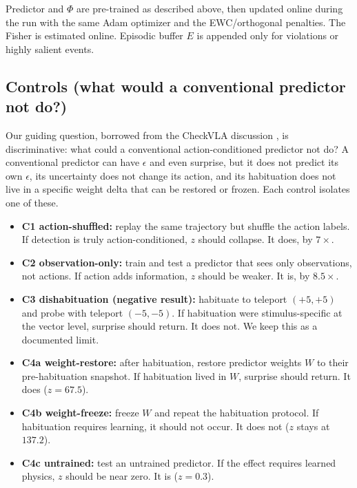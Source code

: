 \documentclass[11pt,a4paper]{article}
\begin{document}
Predictor and $\Phi$ are pre-trained as described above, then updated online during the run with the same Adam optimizer and the EWC/orthogonal penalties. The Fisher is estimated online. Episodic buffer $E$ is appended only for violations or highly salient events.

\subsection{Controls (what would a conventional predictor not do?)}

Our guiding question, borrowed from the CheckVLA discussion \cite{checkvla2026}, is discriminative: what could a conventional action-conditioned predictor not do? A conventional predictor can have $\epsilon$ and even surprise, but it does not predict its own $\epsilon$, its uncertainty does not change its action, and its habituation does not live in a specific weight delta that can be restored or frozen. Each control isolates one of these.

\begin{itemize}[leftmargin=1.2em]
    \item \textbf{C1 action-shuffled:} replay the same trajectory but shuffle the action labels. If detection is truly action-conditioned, $z$ should collapse. It does, by $7\times$.
    \item \textbf{C2 observation-only:} train and test a predictor that sees only observations, not actions. If action adds information, $z$ should be weaker. It is, by $8.5\times$.
    \item \textbf{C3 dishabituation (negative result):} habituate to teleport $(+5,+5)$ and probe with teleport $(-5,-5)$. If habituation were stimulus-specific at the vector level, surprise should return. It does not. We keep this as a documented limit.
    \item \textbf{C4a weight-restore:} after habituation, restore predictor weights $W$ to their pre-habituation snapshot. If habituation lived in $W$, surprise should return. It does ($z=67.5$).
    \item \textbf{C4b weight-freeze:} freeze $W$ and repeat the habituation protocol. If habituation requires learning, it should not occur. It does not ($z$ stays at $137.2$).
    \item \textbf{C4c untrained:} test an untrained predictor. If the effect requires learned physics, $z$ should be near zero. It is ($z=0.3$).
\end{itemize}
\end{document}
